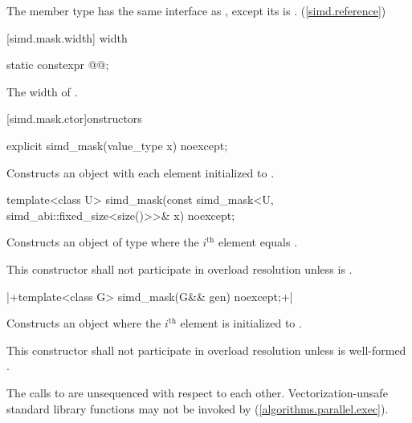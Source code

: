 \pnum
The member type  has the same interface as , except its  is . (\ref{simd.reference})

[simd.mask.width]{ width}

\begin{itemdecl}
static constexpr @@;
\end{itemdecl}

\begin{itemdescr}
  \pnum\returns
  The width of .
\end{itemdescr}

[simd.mask.ctor]{\texorpdfstring{onstructors}{simd_mask constructors}}

\begin{itemdecl}
explicit simd_mask(value_type x) noexcept;
\end{itemdecl}

\begin{itemdescr}
  \pnum\effects
  Constructs an object with each element initialized to .
\end{itemdescr}

\begin{itemdecl}
template<class U> simd_mask(const simd_mask<U, simd_abi::fixed_size<size()>>& x) noexcept;
\end{itemdecl}

\begin{itemdescr}
  \pnum\effects
  Constructs an object of type  where the $i^\text{th}$ element equals  \foralli.

  \pnum\remarks
  This constructor shall not participate in overload resolution unless  is .
\end{itemdescr}

\begin{wgBAdd}
\begin{itemdecl}
|+template<class G> simd_mask(G&& gen) noexcept;+|
\end{itemdecl}

\begin{itemdescr}
  \pnum\effects
  Constructs an object where the $i^\text{th}$ element is initialized to .

  \pnum\remarks
  This constructor shall not participate in overload resolution unless  is well-formed \foralli.

  \pnum
  The calls to  are unsequenced with respect to each other.
  Vectorization-unsafe standard library functions may not be invoked by  (\ref{algorithms.parallel.exec}).
\end{itemdescr}
\end{wgBAdd}

